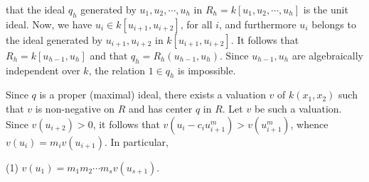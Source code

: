 that the ideal $q_h$ generated by $u_1, u_2, \cdots, u_h$ in $R_h = k[u_1, u_2, \cdots, u_h]$ is the unit ideal. Now, we have $u_i \in k[u_{i+1}, u_{i+2}]$, for all $i$, and furthermore $u_i$ belongs to the ideal generated by $u_{i+1}, u_{i+2}$ in $k[u_{i+1}, u_{i+2}]$. It follows that $R_h = k[u_{h-1}, u_h]$ and that $q_h = R_h(u_{h-1}, u_h)$. Since $u_{h-1}, u_h$ are algebraically independent over $k$, the relation $1 \in q_h$ is impossible.

Since $q$ is a proper (maximal) ideal, there exists a valuation $v$ of $k(x_1, x_2)$ such that $v$ is non-negative on $R$ and has center $q$ in $R$. Let $v$ be such a valuation. Since $v(u_{i+2}) > 0$, it follows that $v(u_i - c_i u_{i+1}^m) > v(u_{i+1}^m)$, whence $v(u_i) = m_i v(u_{i+1})$. In particular,

(1) $v(u_1) = m_1 m_2 \cdots m_s v(u_{s+1})$.

